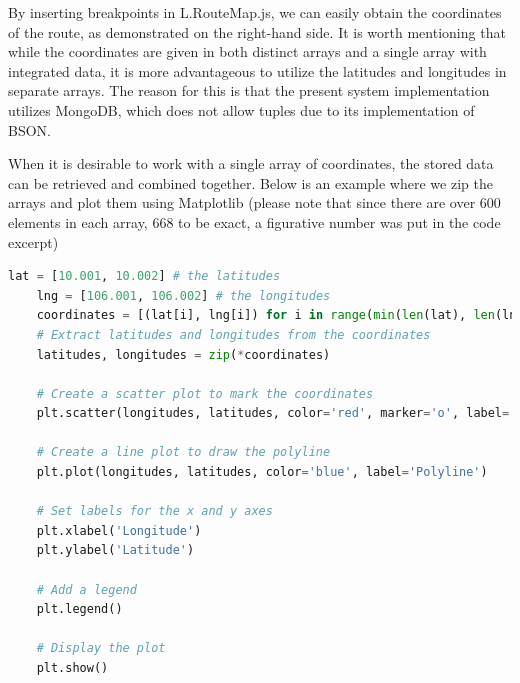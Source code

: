 By inserting breakpoints in L.RouteMap.js, we can easily obtain the coordinates of the route, as demonstrated on the right-hand side. It is worth mentioning that while the coordinates are given in both distinct arrays and a single array with integrated data, it is more advantageous to utilize the latitudes and longitudes in separate arrays. The reason for this is that the present system implementation utilizes MongoDB, which does not allow tuples due to its implementation of BSON.

When it is desirable to work with a single array of coordinates, the stored data can be retrieved and combined together. Below is an example where we zip the arrays and plot them using Matplotlib (please note that since there are over 600 elements in each array, 668 to be exact, a figurative number was put in the code excerpt)

\begin{lstlisting}[language=python]
    lat = [10.001, 10.002] # the latitudes
    lng = [106.001, 106.002] # the longitudes
    coordinates = [(lat[i], lng[i]) for i in range(min(len(lat), len(lng)))]
    # Extract latitudes and longitudes from the coordinates
    latitudes, longitudes = zip(*coordinates)
    
    # Create a scatter plot to mark the coordinates
    plt.scatter(longitudes, latitudes, color='red', marker='o', label='Coordinates')
    
    # Create a line plot to draw the polyline
    plt.plot(longitudes, latitudes, color='blue', label='Polyline')
    
    # Set labels for the x and y axes
    plt.xlabel('Longitude')
    plt.ylabel('Latitude')
    
    # Add a legend
    plt.legend()
    
    # Display the plot
    plt.show()
\end{lstlisting}

